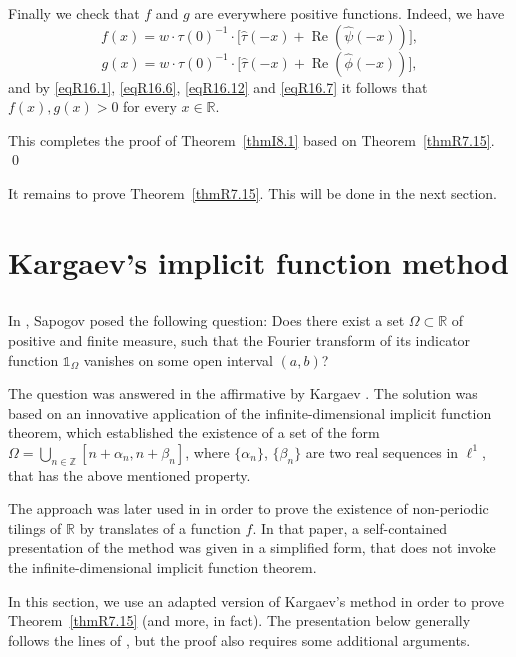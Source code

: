 \documentclass[reqno,a4paper,12pt]{amsart}
\numberwithin{equation}{section}
\numberwithin{figure}{section}
\newcommand\R{\mathbb{R}}
\newcommand\Z{\mathbb{Z}}
\newcommand\Om{\Omega}
\newcommand\1{\mathds{1}}
\newcommand\sbt{\subset}
\renewcommand\Re{\operatorname{Re}}
\newcommand{\ft}[1]{\widehat{#1}}
\theoremstyle{plain}
\newcommand{\thmref}[1]{Theorem~\ref{#1}}
\theoremstyle{definition}
\begin{document}
Finally we check that
$f$ and $g$ are everywhere positive functions. Indeed, we have
\[
f(x) =
w \cdot \tau(0)^{-1} \cdot \Big[ \ft{\tau}(-x) + 
 \Re(\ft{\psi}(-x) ) \Big],
\]
\[
g(x) =
w \cdot \tau(0)^{-1} \cdot \Big[ \ft{\tau}(-x) + 
 \Re(\ft{\phi}(-x) ) \Big],
\]
and by \eqref{eqR16.1}, \eqref{eqR16.6},
\eqref{eqR16.12} and \eqref{eqR16.7}
 it follows that 
$f(x), g(x) >0$ for every $x \in \R$.


This completes the proof of \thmref{thmI8.1}
based on \thmref{thmR7.15}.
\qed

It remains to prove \thmref{thmR7.15}.
This will be done in the next section.








\section{Kargaev's implicit function method} \label{secR2}



\subsection{}
In \cite{Sap78}, Sapogov posed the 
following question: Does there exist a set $\Omega \sbt \R$
of positive and  finite  measure, 
such that the Fourier transform of its indicator function 
$\1_\Om$  vanishes on some open interval $(a,b)$?

 The question
was answered in the affirmative by 
Kargaev \cite{Kar82}. The solution was based on
an innovative application
 of the infinite-dimensional implicit function 
theorem, which established the existence of a 
set of the form
$ \Om = \bigcup_{n\in\Z} [n+\alpha_n, n+\beta_n]$,
where $\{\alpha_n\}$, $\{\beta_n\}$
are two real sequences in $\ell^1$, 
that has the above mentioned property.

The approach was later used in \cite{KL16} in
order to prove the existence of 
non-periodic tilings of $\R$ by 
 translates of a function $f$.
In that paper,  a self-contained
presentation of the method was given
in a simplified form, that does not invoke
 the infinite-dimensional implicit function
theorem.


In this section, we use an adapted version
of Kargaev's method in order to prove 
 \thmref{thmR7.15} (and more, in fact).
The presentation below generally 
follows the lines of \cite[Sections 2, 3]{KL16},
but the proof also requires some additional arguments.
\end{document}
